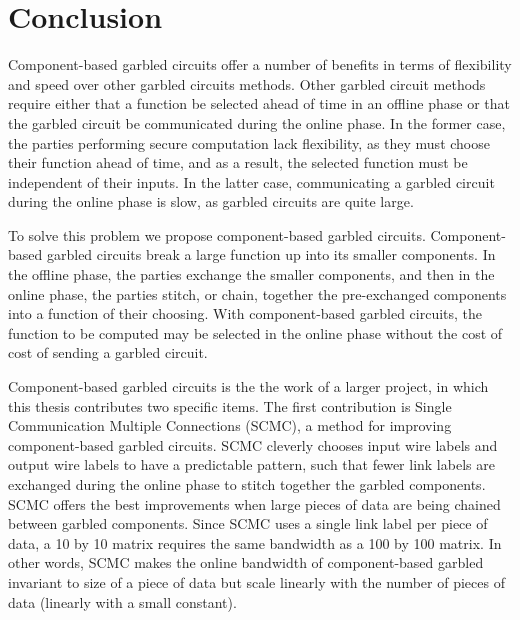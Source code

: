 
\chapter*{Conclusion}
	\setcounter{chapter}{4}
	\setcounter{section}{0}

Component-based garbled circuits offer a number of benefits in terms of flexibility and speed over other garbled circuits methods.
Other garbled circuit methods require either that a function be selected ahead of time in an offline phase or that the garbled circuit be communicated during the online phase.
In the former case, the parties performing secure computation lack flexibility, as they must choose their function ahead of time, and as a result, the selected function must be independent of their inputs.
In the latter case, communicating a garbled circuit during the online phase is slow, as garbled circuits are quite large.

To solve this problem we propose component-based garbled circuits.
Component-based garbled circuits break a large function up into its smaller components.
In the offline phase, the parties exchange the smaller components, and then in the online phase, the parties stitch, or chain, together the pre-exchanged components into a function of their choosing.
With component-based garbled circuits, the function to be computed may be selected in the online phase without the cost of cost of sending a garbled circuit.

Component-based garbled circuits is the the work of a larger project, in which this thesis contributes two specific items. 
The first contribution is Single Communication Multiple Connections (SCMC), a method for improving component-based garbled circuits.
SCMC cleverly chooses input wire labels and output wire labels to have a predictable pattern, such that fewer link labels are exchanged during the online phase to stitch together the garbled components.
SCMC offers the best improvements when large pieces of data are being chained between garbled components.
Since SCMC uses a single link label per piece of data, a 10 by 10 matrix requires the same bandwidth as a 100 by 100 matrix.
In other words, SCMC makes the online bandwidth of component-based garbled invariant to size of a piece of data but scale linearly with the number of pieces of data (linearly with a small constant).

